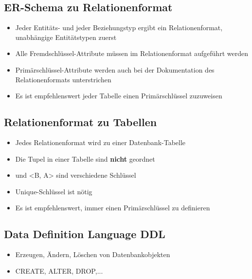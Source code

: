 \documentclass[8pt,a4paper]{scrartcl}
\begin{document}
\begin{multicols*}{3}
			\subsection{ER-Schema zu Relationenformat}
				\begin{itemize}\itemsep0pt		
					\item Jeder Entitäts- und jeder Beziehungstyp ergibt ein Relationenformat, unabhängige Entitätstypen zuerst
					\item Alle Fremdschlüssel-Attribute müssen im Relationenformat aufgeführt werden
					\item Primärschlüssel-Attribute werden auch bei der Dokumentation des Relationenformats unterstrichen
					\item Es ist empfehlenswert jeder Tabelle einen Primärschlüssel zuzuweisen
				\end{itemize}
				
			\subsection{Relationenformat zu Tabellen}
				\begin{itemize}\itemsep0pt		
					\item Jedes Relationenformat wird zu einer Datenbank-Tabelle
					\item Die Tupel in einer Tabelle sind \textbf{nicht} geordnet
					\item <A, B> und <B, A> sind verschiedene Schlüssel
					\item Unique-Schlüssel ist nötig 
					\item Es ist empfehlenswert, immer einen Primärschlüssel zu definieren
					 
				\end{itemize}
				
			\subsection{Data Definition Language DDL}
				\begin{itemize}\itemsep0pt		
					\item Erzeugen, Ändern, Löschen von Datenbankobjekten
					\item CREATE, ALTER, DROP,...
				\end{itemize}
				

\end{multicols*}
\end{document}
